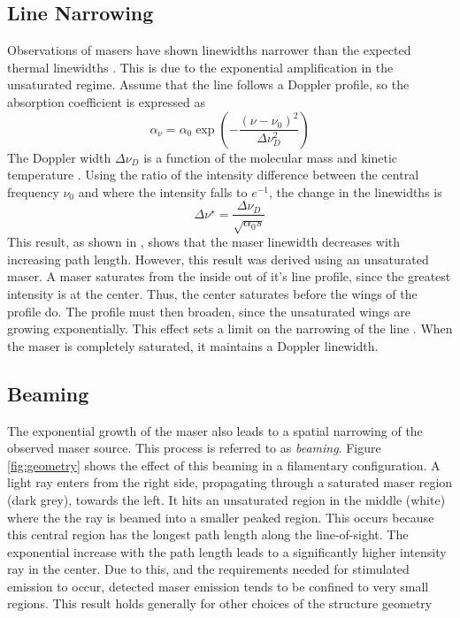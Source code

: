 \subsection{Line Narrowing}
\label{sub:line_narrow}

Observations of masers have shown linewidths narrower than the expected thermal linewidths \citep[][e.g.,]{Elitzur_1992, stahler_palla_2004}. This is due to the exponential amplification in the unsaturated regime. Assume that the line follows a Doppler profile, so the absorption coefficient is expressed as
\begin{equation}
\label{eq:doppler_profile}
\alpha_\nu = \alpha_0 \exp\left( -\frac{(\nu - \nu_0)^2}{\Delta\nu_D^2} \right)
\end{equation}
The Doppler width $\Delta\nu_D$ is a function of the molecular mass and kinetic temperature \citep{stahler_palla_2004}. Using the ratio of the intensity difference between the central frequency $\nu_0$ and where the intensity falls to $e^{-1}$, the change in the linewidths is
\begin{equation}
\label{eq:line_narrow}
\Delta\nu^\star = \frac{\Delta\nu_D}{\sqrt{\alpha_0 s}}
\end{equation}
This result, as shown in \citet{stahler_palla_2004}, shows that the maser linewidth decreases with increasing path length. However, this result was derived using an unsaturated maser. A maser saturates from the inside out of it's line profile, since the greatest intensity is at the center. Thus, the center saturates before the wings of the profile do. The profile must then broaden, since the unsaturated wings are growing exponentially. This effect sets a limit on the narrowing of the line \citep{Elitzur_1992, stahler_palla_2004}. When the maser is completely saturated, it maintains a Doppler linewidth. 

\subsection{Beaming}
\label{sub:beaming}

The exponential growth of the maser also leads to a spatial narrowing of the observed maser source. This process is referred to as {\it beaming}. Figure \ref{fig:geometry} shows the effect of this beaming in a filamentary configuration. A light ray enters from the right side, propagating through a saturated maser region (dark grey), towards the left. It hits an unsaturated region in the middle (white) where the the ray is beamed into a smaller peaked region. This occurs because this central region has the longest path length along the line-of-sight. The exponential increase with the path length leads to a significantly higher intensity ray in the center. Due to this, and the requirements needed for stimulated emission to occur, detected maser emission tends to be confined to very small regions. This result holds generally for other choices of the structure geometry 
